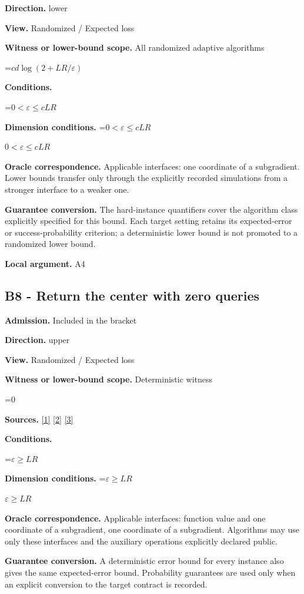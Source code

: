 \documentclass[10pt,a4paper]{article}
\newcommand{\AtlasMath}[1]{\par\begingroup\centering\setbox0=\hbox{$\displaystyle #1$}\ifdim\wd0>1.4\linewidth\typeout{ATLAS WIDE FORMULA: \the\wd0}\fi\ifdim\wd0>\linewidth\resizebox{\linewidth}{!}{\box0}\else\box0\fi\par\endgroup}
\newcommand{\AtlasInlineMath}[1]{\begingroup\setbox0=\hbox{$#1$}\ifdim\wd0>.4\linewidth\endgroup\AtlasMath{#1}\else\endgroup$#1$\fi}
\begin{document}
\textbf{Direction.} lower

\textbf{View.} Randomized / Expected loss

\textbf{Witness or lower-bound scope.} All randomized adaptive algorithms

\AtlasMath{cd\log(2+LR/\varepsilon)}
\textbf{Conditions.} 
\AtlasMath{0<\varepsilon\le cLR}


\textbf{Dimension conditions.} \AtlasInlineMath{0<\varepsilon\le cLR}

\textbf{Oracle correspondence.} Applicable interfaces: one coordinate of a subgradient. Lower bounds transfer only through the explicitly recorded simulations from a stronger interface to a weaker one.

\textbf{Guarantee conversion.} The hard-instance quantifiers cover the algorithm class explicitly specified for this bound. Each target setting retains its expected-error or success-probability criterion; a deterministic lower bound is not promoted to a randomized lower bound.

\textbf{Local argument.} A4

\subsection{B8 - Return the center with zero queries}
\textbf{Admission.} Included in the bracket

\textbf{Direction.} upper

\textbf{View.} Randomized / Expected loss

\textbf{Witness or lower-bound scope.} Deterministic witness

\AtlasMath{0}
\textbf{Sources.} \href{https://arxiv.org/pdf/1405.4980}{[1]} \href{https://www2.isye.gatech.edu/~nemirovs/MOR_AccuracyCertificates.pdf}{[2]} \href{https://arxiv.org/pdf/2609.20701}{[3]}

\textbf{Conditions.} 
\AtlasMath{\varepsilon\ge LR}


\textbf{Dimension conditions.} \AtlasInlineMath{\varepsilon\ge LR}

\textbf{Oracle correspondence.} Applicable interfaces: function value and one coordinate of a subgradient, one coordinate of a subgradient. Algorithms may use only these interfaces and the auxiliary operations explicitly declared public.

\textbf{Guarantee conversion.} A deterministic error bound for every instance also gives the same expected-error bound. Probability guarantees are used only when an explicit conversion to the target contract is recorded.
\end{document}
